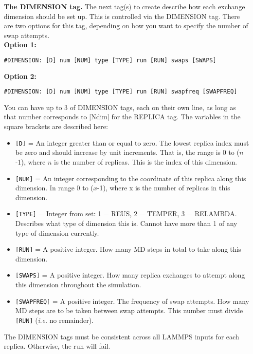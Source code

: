 \documentclass[10pt]{article}
\begin{document}
\textbf{The DIMENSION tag.}
The next tag(s) to create describe how each exchange dimension should be set up. This
is controlled via the DIMENSION tag. There are two options for this tag, depending on
how you want to specify the number of swap attempts.\\
\textbf{Option 1:}
\begin{verbatim}
#DIMENSION: [D] num [NUM] type [TYPE] run [RUN] swaps [SWAPS]
\end{verbatim}
\textbf{Option 2:}
\begin{verbatim}
#DIMENSION: [D] num [NUM] type [TYPE] run [RUN] swapfreq [SWAPFREQ]
\end{verbatim}
You can have up to 3 of DIMENSION tags, each on their own line, as
long as that number corresponds to [Ndim] for the REPLICA tag. 
The variables in the square brackets are described here:
\begin{itemize}
\item	\texttt{[D]} = An integer greater than or equal to zero. The lowest
		replica index must be zero and should increase by unit increments. That is,
		the range is 0 to ($n$-1), where $n$ is the number of replicas. This is
		the index of this dimension.
\item	\texttt{[NUM]} = An integer corresponding to the coordinate of this replica
		along this dimension. In range 0 to ($x$-1), where x is the number of replicas
		in this dimension.
\item 	\texttt{[TYPE]} = Integer from set: 1 = REUS, 2 = TEMPER, 3 = RELAMBDA. Describes
		what type of dimension this is. Cannot have more than 1 of any type of dimension currently.
\item	\texttt{[RUN]} = A positive integer. How many MD steps in total to take along
		this dimension.
\item	\texttt{[SWAPS]} = A positive integer. How many replica exchanges to attempt along this
		dimension throughout the simulation.
\item 	\texttt{[SWAPFREQ]} = A positive integer. The frequency of swap attempts. How many MD steps
		are to be taken between swap attempts. This number must divide \texttt{[RUN]} ({\em i.e.} no remainder).
\end{itemize}


The DIMENSION tags must be consistent across all LAMMPS inputs for each replica. Otherwise,
the run will fail.
\end{document}
